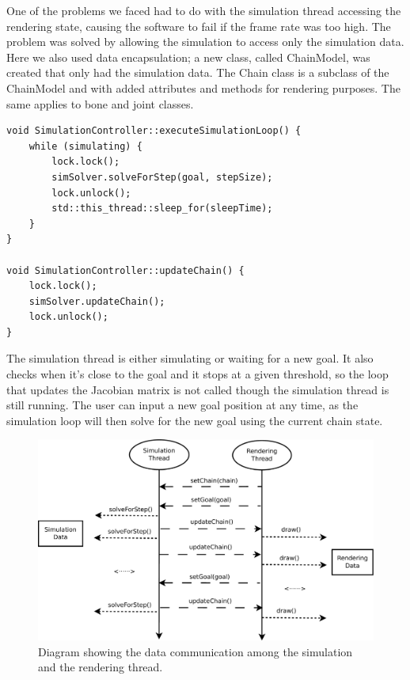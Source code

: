 \documentclass[paper=a4, fontsize=11pt]{scrartcl} %
\numberwithin{equation}{section} %
\numberwithin{figure}{section} %
\numberwithin{table}{section} %
\begin{document}
One of the problems we faced had to do with the simulation thread accessing the rendering state, causing the software to fail if the frame rate was too high. The problem was solved by allowing the simulation to access only the simulation data. Here we also used data encapsulation; a new class, called ChainModel, was created that only had the simulation data. The Chain class is a subclass of the ChainModel and with added attributes and methods for rendering purposes. The same applies to bone and joint classes. \\

\begin{lstlisting}[float,caption=Simulation controller thread synchronisation., label={lst:synchronisation}]		
void SimulationController::executeSimulationLoop() {
	while (simulating) {
		lock.lock();
		simSolver.solveForStep(goal, stepSize);
		lock.unlock();
		std::this_thread::sleep_for(sleepTime);
	}
}

void SimulationController::updateChain() {
	lock.lock();
	simSolver.updateChain();
	lock.unlock();
}
\end{lstlisting}

The simulation thread is either simulating or waiting for a new goal. It also checks when it's close to the goal and it stops at a given threshold, so the loop that updates the Jacobian matrix is not called though the simulation thread is still running. The user can input a new goal position at any time, as the simulation loop will then solve for the new goal using the current chain state.\\

\begin{figure}[h]
\centering
\includegraphics[scale=0.4]{threadDiagram}
\caption{Diagram showing the data communication among the simulation and the rendering thread.}
\label{fig:scaling}
\end{figure}
\end{document}
